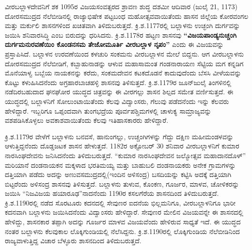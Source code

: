 ವೀರಬಲ್ಲಾಳದೇವನಿಗೆ ಶಕ 1095ರ ವಿಜಯಸಂವತ್ಸರದ ಶ್ರಾವಣ ಶುದ್ಧ ದಶಮೀ ಆದಿವಾರ (ಜುಲೈ 21, 1173) ದೋರಸಮುದ್ರದ ನೆಲೆಬೀಡಿನಲ್ಲಿ ರಾಜ್ಯಾಭಿಷೇಕ ಪಟ್ಟಬಂಧ ಮಹೋತ್ಸವವಾಯಿತೆಂದು ಹಾಸನ ಜಿಲ್ಲೆಯ ಕೋರವಂಗಲ ಮತ್ತು ಮರ್ಕುಲಿ ಶಾಸನಗಳಿಂದ ಖಚಿತವಾಗಿ ತಿಳಿದುಬರುತ್ತದೆ. ಕ್ರಿ.ಶ.1177ರಲ್ಲಿ ಬಲ್ಲಾಳನು ಉಚ್ಛಂಗಿ ದುರ್ಗವನ್ನು ಜಯಿಸಿ ಶನಿವಾರಸಿದ್ಧಿ ಎಂಬ ಬಿರುದನ್ನು ಧರಿಸಿದನು. ಕ್ರಿ.ಶ.1178ರ ಹಟ್ಟಣ ಶಾಸನವು \textbf{“ವಿಜಯಪಾಂಡ್ಯನುಚ್ಚಂಗಿ ದುರ್ಗಮನುರವಣೆಯಿಂ ಕೊಂಡನಸಮ ತೇಜೋಮೂರ್ತಿ ವೀರಬಲ್ಲಾಳ ನೃಪಂ”} ಎಂದು ಈ ವಿಜಯವನ್ನು ಪ್ರಸ್ತಾಪಿಸಿದೆ. ಬಲ್ಲಾಳನ ಉರವಣೆಯಿಂದ ಕಳಚುರಿ ಸಂಕಮನು ವೀರಬಲ್ಲಾಳನ ಮೇಲೆ ಬಿದ್ದನು. ಆಗ ವೀರಬಲ್ಲಾಳನು ದೋರಸಮುದ್ರದ ನೆಲೆಬೀಡಿಗೆ, ಕಬ್ಬಾಹುನಾಡನ್ನು ಆಳುವ ಮಹಾಸಾಮಂತ ಗಂಡನಾರಾಯಣ ಸೆಟ್ಟಿಯ ಮಗ ಕನ್ನಡಿಗ ಮೊನೆಯಾಳ್ವ ಬಬ್ಬೆಯ ನಾಯಕನನ್ನು ಕರೆದು, ಸಂಕಮದೇವನ ಕಟಕದೊಡನೆ ಕಾದುವುದೆಂದು ಬೆಸಸಿ ವೀಳೆಯವನ್ನು ಕೊಟ್ಟು ಕಳುಹಿಸಿದನೆಂದು ಅಗ್ರಹಾರಬಾಚಹಳ್ಳಿ ಶಾಸನವು ತಿಳಿಸುತ್ತದೆ. ಕ್ರಿ.ಶ.1179ರ ಜೂನ್​ಜುಲೈ ತಿಂಗಳಿನಲ್ಲಿ ನಡೆದಿರಬಹುದಾದ ಘನಘೋರ ಯುದ್ಧದ ಚಿತ್ರವನ್ನು ಈ ವೀರಗಲ್ಲು ಶಾಸನ ಶಿಲ್ಪದ ಸಮೇತ ವರ್ಣಿಸುತ್ತದೆ. ಈ ಯುದ್ಧದಲ್ಲಿ ಬಲ್ಲಾಳನಿಗೆ ಸೋಲುಂಟಾಯಿತೆಂದು ಕೆಲವು ವಿದ್ವಾಂಸರು, ಗೆಲುವು ಪಡೆದನೆಂದು ಇನ್ನು ಕೆಲವರು ಹೇಳಿದ್ದಾರೆ. ಇಬ್ಬರಿಗೂ ಒಪ್ಪಂದವಾಗಿ ತುಂಗಭದ್ರೆಯ ಪೂರ್ವಪಶ್ಚಿಮಗಳಲ್ಲಿ ಚಾಳುಕ್ಯ ಸಾಮ್ರಾಜ್ಯವನ್ನು ವಶಪಡಿಸಿಕೊಳ್ಳಲು ಅವಕಾಶವಾಯಿತೆಂದು ಕೆಲವು ಇತಿಹಾಸಕಾರರು ಹೇಳಿದ್ದಾರೆ. 

ಕ್ರಿ.ಶ.1179ರ ವೇಳೆಗೆ ಬಲ್ಲಾಳನು ಬನವಸೆ, ಹಾನುಂಗಲ್ಲು, ಉಚ್ಚಂಗಿಗಳನ್ನು ಗೆದ್ದು ದಕ್ಷಿಣ ಮಹೀಮಂಡಳವನ್ನು ಆಳುತ್ತಿದ್ದನೆಂದು ದೊಡ್ಡಜಟಕ ಶಾಸನ ಹೇಳುತ್ತದೆ. 1182ರ ಅಕ್ಟೋಬರ್​ 30 ಶನಿವಾರ ವೀರಬಲ್ಲಾಳನಿಗೆ ಕುಮಾರ ನಾರಸಿಂಘದೇವನು ಜನಿಸಿದನೆಂದು ತಿಳಿದುಬರುತ್ತದೆ. “ಕುಮಾರ ನಾರಸಿಂಘದೇವನ ಜಲ್ಮೋತ್ಸವ ಮಹಾದಾನದೊಳ್​” ಮರಿಯಾನೆ ದಂಡನಾಯಕನ ಮಕ್ಕಳಾದ ಭರತಿಮಯ್ಯ ಮತ್ತು ಬಾಹುಬಲಿ ದಂಡನಾಯಕರು ಅನೇಕ ಗ್ರಾಮಗಳನ್ನು ದತ್ತಿಯಾಗಿ ಪಡೆದು ಅದನ್ನು ಅಣುವಸಮುದ್ರದಲ್ಲಿ(ಇಂದಿನ ಅಳಿಸಂದ್ರ) ಬಸದಿಯನ್ನು ಕಟ್ಟಿಸಿ ಅದಕ್ಕೆ ದತ್ತಿಯಾಗಿ ಬಿಟ್ಟರೆಂದು ಅಳಿಸಂದ್ರ ಶಾಸನವು ತಿಳಿಸುತ್ತದೆ. ಬಲ್ಲಾಳನು ತುಳುವ, ಕೊಂಕಣ, ಗೂರ್ಜರ, ಮಾಳವ, ಚೋಳಿಕರನ್ನು ಜಯಿಸಿ “ನಿಜವಿಜಯ ಹಯಾರೂಢ”ನಾದನೆಂದು 1190ರ ಕಸಲಗೆರೆಯ ಶಾಸನದಿಂದ ತಿಳಿದುಬರುತ್ತದೆ.  ಕ್ರಿ.ಶ.1190ರಲ್ಲಿ ನಡೆದ ಸೊರಟೂರು ಕದನದಲ್ಲಿ ಸೇವುಣರ ಐದನೆಯ ಭಿಲ್ಲಮನಿಗೂ, ವೀರಬಲ್ಲಾಳನಿಗೂ ಭಾರೀ ಕದನವಾಗಿ ಬಲ್ಲಾಳನು ಜಯಿಸಿದನೆಂದು ವಿದ್ವಾಂಸರು ಹೇಳಿದ್ದಾರೆ. ಸೇವುಣರ ಮೇಲಿನ ವಿಜಯವನ್ನೇ ಈ ಶಾಸನದಲ್ಲಿ ಹೇಳಿದ್ದು, ಶಾಸನಕಾರ ತಪ್ಪಾಗಿ ಅದನ್ನು ಗೂರ್ಜರ ಮಾಳವ ವಿಜಯವೆಂದು ಹೇಳಿರುವ ಸಾಧ್ಯತೆ ಇದೆ. ಈ ಯುದ್ಧದ ನಂತರ ಬಲ್ಲಾಳನು ಕೆಲವುಕಾಲ ಲೊಕ್ಕಿಗುಂಡಿಯಲ್ಲಿ ನೆಲೆಸಿದ್ದನು. ಕ್ರಿ.ಶ.1190ರಲ್ಲಿ ಲೊಕ್ಕಿಗುಂಡಿಯ ನೆಲೆಬೀಡಿನಿಂದ ರಾಜ್ಯವಾಳುತ್ತಿದ್ದ ವಿಚಾರ ಬೆಳ್ಳೂರು ಶಾಸನದಿಂದ ತಿಳಿದುಬರುತ್ತದೆ. 

